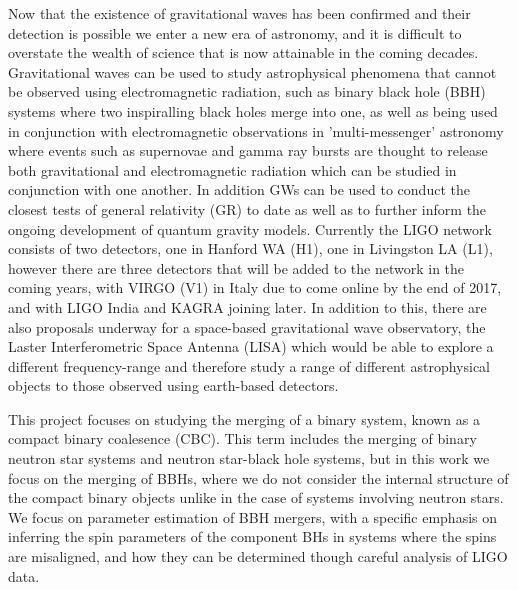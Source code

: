 \documentclass[11pt]{article}
\begin{document}
Now that the existence of gravitational waves has been confirmed and their detection is possible we enter a new era of astronomy, and it is difficult to overstate the wealth of science that is now attainable in the coming decades. Gravitational waves can be used to study astrophysical phenomena that cannot be observed using electromagnetic radiation, such as binary black hole (BBH) systems where two inspiralling black holes merge into one, as well as being used in conjunction with electromagnetic observations in 'multi-messenger' astronomy where events such as supernovae and gamma ray bursts are thought to release both gravitational and electromagnetic radiation which can be studied in conjunction with one another\cite{mm}\cite{mm2}. In addition GWs can be used to conduct the closest tests of general relativity (GR) to date\cite{gr1}\cite{gr2} as well as to further inform the ongoing development of quantum gravity models\cite{qgrav}. Currently the LIGO network consists of two detectors, one in Hanford WA (H1), one in Livingston LA (L1), however there are three detectors that will be added to the network in the coming years, with VIRGO (V1) in Italy due to come online by the end of 2017, and with LIGO India and KAGRA joining later. In addition to this, there are also proposals underway for a space-based gravitational wave observatory, the Laster Interferometric Space Antenna (LISA)\cite{lisa} which would be able to explore a different frequency-range and therefore study a range of different astrophysical objects to those observed using earth-based detectors.

This project focuses on studying the merging of a binary system, known as a compact binary coalesence (CBC). This term includes the merging of binary neutron star systems and neutron star-black hole systems, but in this work we focus on the merging of BBHs, where we do not consider the internal structure of the compact binary objects unlike in the case of systems involving neutron stars. We focus on parameter estimation of BBH mergers, with a specific emphasis on inferring the spin parameters of the component BHs in systems where the spins are misaligned, and how they can be determined though careful analysis of LIGO data.
\end{document}
